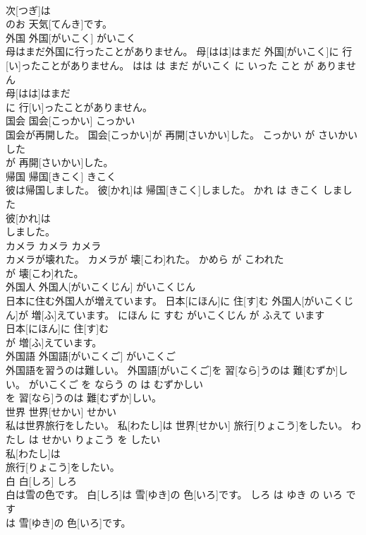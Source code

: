 \documentclass[8pt]{extreport}
\begin{document}
\begin{CJK}{UTF8}{min}
\\	次[つぎ]は
\\	のお 天気[てんき]です。		
\\	外国	外国[がいこく]	がいこく	
\\	母はまだ外国に行ったことがありません。	母[はは]はまだ 外国[がいこく]に 行[い]ったことがありません。	はは は まだ がいこく に いった こと が ありません	
\\	母[はは]はまだ
\\	に 行[い]ったことがありません。		
\\	国会	国会[こっかい]	こっかい	
\\	国会が再開した。	国会[こっかい]が 再開[さいかい]した。	こっかい が さいかい した	
\\	が 再開[さいかい]した。		
\\	帰国	帰国[きこく]	きこく	
\\	彼は帰国しました。	彼[かれ]は 帰国[きこく]しました。	かれ は きこく しました	
\\	彼[かれ]は
\\	しました。		
\\	カメラ	カメラ	カメラ	
\\	カメラが壊れた。	カメラが 壊[こわ]れた。	かめら が こわれた	
\\	が 壊[こわ]れた。		
\\	外国人	外国人[がいこくじん]	がいこくじん	
\\	日本に住む外国人が増えています。	日本[にほん]に 住[す]む 外国人[がいこくじん]が 増[ふ]えています。	にほん に すむ がいこくじん が ふえて います	
\\	日本[にほん]に 住[す]む
\\	が 増[ふ]えています。		
\\	外国語	外国語[がいこくご]	がいこくご	
\\	外国語を習うのは難しい。	外国語[がいこくご]を 習[なら]うのは 難[むずか]しい。	がいこくご を ならう の は むずかしい	
\\	を 習[なら]うのは 難[むずか]しい。		
\\	世界	世界[せかい]	せかい	
\\	私は世界旅行をしたい。	私[わたし]は 世界[せかい] 旅行[りょこう]をしたい。	わたし は せかい りょこう を したい	
\\	私[わたし]は
\\	旅行[りょこう]をしたい。		
\\	白	白[しろ]	しろ	
\\	白は雪の色です。	白[しろ]は 雪[ゆき]の 色[いろ]です。	しろ は ゆき の いろ です	
\\	は 雪[ゆき]の 色[いろ]です。		

\end{CJK}
\end{document}
